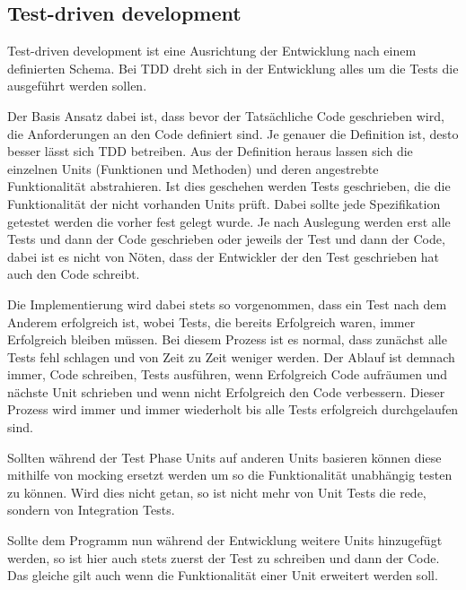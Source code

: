 \subsection{Test-driven development}\label{einleitung:tdd}

Test-driven development ist eine Ausrichtung der Entwicklung nach einem definierten Schema.
Bei TDD dreht sich in der Entwicklung alles um die Tests die ausgeführt werden sollen.

Der Basis Ansatz dabei ist, dass bevor der Tatsächliche Code geschrieben wird, die Anforderungen
an den Code definiert sind. Je genauer die Definition ist, desto besser lässt sich TDD betreiben.
Aus der Definition heraus lassen sich die einzelnen Units (Funktionen und Methoden) und deren
angestrebte Funktionalität abstrahieren. Ist dies geschehen werden Tests geschrieben, die die
Funktionalität der nicht vorhanden Units prüft. Dabei sollte jede Spezifikation getestet werden
die vorher fest gelegt wurde. Je nach Auslegung werden erst alle Tests und dann der Code geschrieben
oder jeweils der Test und dann der Code, dabei ist es nicht von Nöten, dass der Entwickler der den
Test geschrieben hat auch den Code schreibt.

Die Implementierung wird dabei stets so vorgenommen, dass ein Test nach dem Anderem erfolgreich ist,
wobei Tests, die bereits Erfolgreich waren, immer Erfolgreich bleiben müssen. Bei diesem Prozess ist
es normal, dass zunächst alle Tests fehl schlagen und von Zeit zu Zeit weniger werden. Der Ablauf ist
demnach immer, Code schreiben, Tests ausführen, wenn Erfolgreich Code aufräumen und nächste Unit
schrieben und wenn nicht Erfolgreich den Code verbessern. Dieser Prozess wird immer und immer
wiederholt bis alle Tests erfolgreich durchgelaufen sind.

Sollten während der Test Phase Units auf anderen Units basieren können diese mithilfe von
\gls{mock}ing ersetzt werden um so die Funktionalität unabhängig testen zu können. Wird dies
nicht getan, so ist nicht mehr von Unit Tests die rede, sondern von Integration Tests.

Sollte dem Programm nun während der Entwicklung weitere Units hinzugefügt werden, so ist hier auch
stets zuerst der Test zu schreiben und dann der Code. Das gleiche gilt auch wenn die Funktionalität
einer Unit erweitert werden soll.

